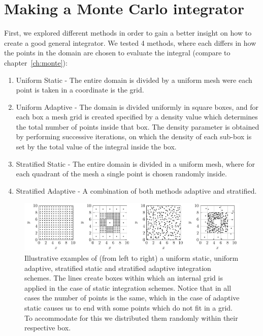 \section{Making a Monte Carlo integrator}
\label{ch:monte_app}

First, we explored different methods in order to gain a better insight on how to create a good general integrator. We tested 4 methods, where each differs in how the points in the domain are chosen to evaluate the integral (compare to chapter~\ref{ch:monte}):
\begin{enumerate}
  \item Uniform Static - The entire domain is divided by a uniform mesh were each point is taken in a coordinate is the grid.
  \item Uniform Adaptive - The domain is divided uniformly in square boxes, and for each box a mesh grid is created
  specified by a density value which determines the total number of points inside that box. The density parameter
  is obtained by performing successive iterations, on which the density of each sub-box is set by the total value of the integral inside
  the box.
  \item Stratified Static - The entire domain is divided in a uniform mesh, where for each quadrant of the mesh
  a single point is chosen randomly inside.
  \item Stratified Adaptive - A combination of both methods adaptive and stratified.
\end{enumerate}
\begin{figure}
  \begin{center}
    \includegraphics[scale=1 ]{graphs/BoxPlotter.pdf}
  \caption{Illustrative examples of (from left to right) a uniform static, uniform adaptive, stratified static and stratified adaptive integration schemes. The lines create boxes within which an internal grid is applied in the case of static integration schemes. Notice that in all cases the number of points is the same, which in the case of adaptive static causes us to end with some points which do not fit in a grid. To accommodate for this we distributed them randomly within their respective box. }
\label{BoxPlotter}
  \end{center}
\end{figure}

